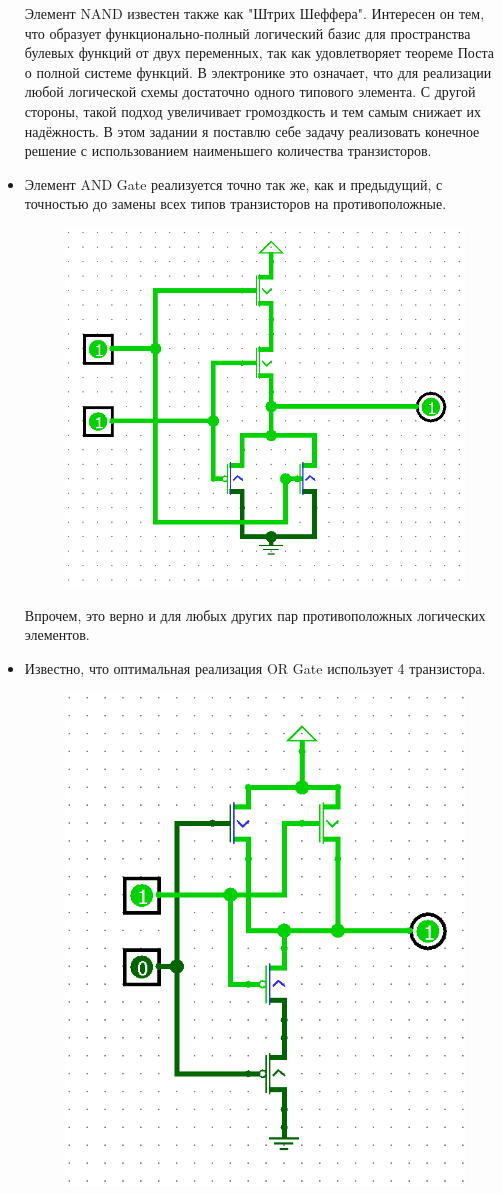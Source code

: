 \begin{itemize}
\begin{figure}[H]
\end{figure}
Элемент NAND известен также как "Штрих Шеффера". Интересен он тем, что образует функционально-полный логический базис для пространства булевых функций от двух переменных, так как удовлетворяет теореме Поста о полной системе функций. В электронике это означает, что для реализации любой логической схемы достаточно одного типового элемента. С другой стороны, такой подход увеличивает громоздкость и тем самым снижает их надёжность. В этом задании я поставлю себе задачу реализовать конечное решение с использованием наименьшего количества транзисторов.\\
\item Элемент AND Gate реализуется точно так же, как и предыдущий, с точностью до замены всех типов транзисторов на противоположные.
\begin{figure}[H]
    \centering
    \includegraphics[width=0.5\linewidth]{Gates/AND.png}
\end{figure}
Впрочем, это верно и для любых других пар противоположных логических элементов.\\
\item Известно, что оптимальная реализация OR Gate использует 4 транзистора.
\begin{figure}[H]
    \centering
    \includegraphics[width=0.5\linewidth]{Gates/OR Gate.png}

\end{figure}
\end{itemize}
